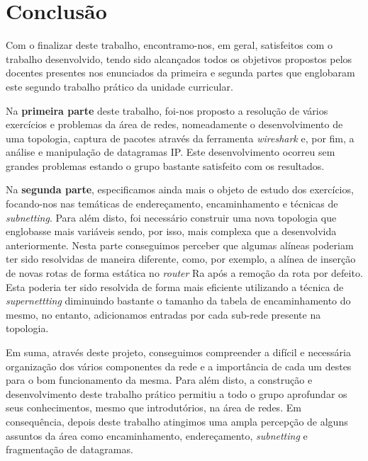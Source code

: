 \documentclass[12pt]{article}
\begin{document}



\newpage
\section{Conclusão}
    \par Com o finalizar deste trabalho, encontramo-nos, em geral, satisfeitos com o trabalho desenvolvido, tendo sido alcançados todos os objetivos propostos pelos docentes presentes nos enunciados da primeira e segunda partes que englobaram este segundo trabalho prático da unidade curricular.

    \par Na \textbf{primeira parte} deste trabalho, foi-nos proposto a resolução de vários exercícios e problemas da área de redes, nomeadamente o desenvolvimento de uma topologia, captura de pacotes através da ferramenta \textit{wireshark} e, por fim, a análise e manipulação de datagramas IP. Este desenvolvimento ocorreu sem grandes problemas estando o grupo bastante satisfeito com os resultados.
    
    \par Na \textbf{segunda parte}, especificamos ainda mais o objeto de estudo dos exercícios, focando-nos nas temáticas de endereçamento, encaminhamento e técnicas de \textit{subnetting}. Para além disto, foi necessário construir uma nova topologia que englobasse mais variáveis sendo, por isso, mais complexa que a desenvolvida anteriormente. Nesta parte conseguimos perceber que algumas alíneas poderiam ter sido resolvidas de maneira diferente, como, por exemplo, a alínea de inserção de novas rotas de forma estática no \textit{router} Ra após a remoção da rota por defeito. Esta poderia ter sido resolvida de forma mais eficiente utilizando a técnica de \textit{supernettting} diminuindo bastante o tamanho da tabela de encaminhamento do mesmo, no entanto, adicionamos entradas por cada sub-rede presente na topologia.
    
    \par Em suma, através deste projeto, conseguimos compreender a difícil e necessária organização dos vários componentes da rede e a importância de cada um destes para o bom funcionamento da mesma. Para além disto, a construção e desenvolvimento deste trabalho prático permitiu a todo o grupo aprofundar os seus conhecimentos, mesmo que introdutórios, na área de redes. Em consequência, depois deste trabalho atingimos uma ampla percepção de alguns assuntos da área como encaminhamento, endereçamento, \textit{subnetting} e fragmentação de datagramas.
\end{document}
